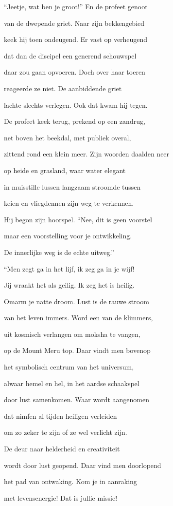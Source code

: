 “Jeetje, wat ben je groot!”
En de profeet genoot

van de dwepende griet.
Naar zijn bekkengebied

keek hij toen ondeugend.
Er vast op verheugend

dat dan de discipel
een generend schouwspel

daar zou gaan opvoeren.
Doch over haar toeren

reageerde ze niet.
De aanbiddende griet

lachte slechts verlegen.
Ook dat kwam hij tegen.

De profeet keek terug,
prekend op een zandrug,

net boven het beekdal,
met publiek overal,

zittend rond een klein meer.
Zijn woorden daalden neer

op heide en grasland,
waar water elegant

in muisstille lussen
langzaam stroomde tussen

keien en vliegdennen
zijn weg te verkennen.

Hij begon zijn hoorspel.
“Nee, dit is geen voorstel

maar een voorstelling
voor je ontwikkeling.

De innerlijke weg
is de echte uitweg.”

“Men zegt ga in het lijf,
ik zeg ga in je wijf!

Jij wraakt het als geilig.
Ik zeg het is heilig.

Omarm je natte droom.
Lust is de rauwe stroom

van het leven immers.
Word een van de klimmers,

uit kosmisch verlangen
om moksha te vangen,

op de Mount Meru top.
Daar vindt men bovenop

het symbolisch centrum
van het universum,

alwaar hemel en hel,
in het aardse schaakspel

door lust samenkomen.
Waar wordt aangenomen

dat nimfen al tijden
heiligen verleiden

om zo zeker te zijn
of ze wel verlicht zijn.

De deur naar helderheid
en creativiteit

wordt door lust geopend.
Daar vind men doorlopend

het pad van ontwaking.
Kom je in aanraking

met levensenergie!
Dat is jullie missie!

